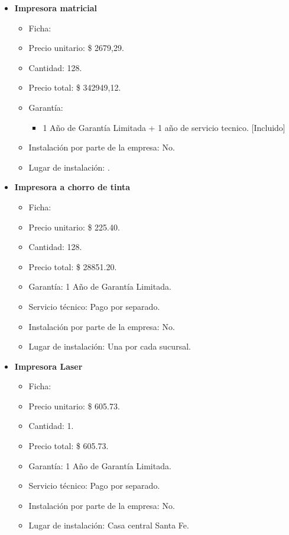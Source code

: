 \begin{itemize}
  \item \textbf{Impresora matricial}
    \begin{itemize}
      \item Ficha:
      \item Precio unitario: \$ 2679,29.
      \item Cantidad: 128.
      \item Precio total: \$ 342949,12.
      
      \item Garantía:
        \begin{itemize}
          \item 1 Año de Garantía Limitada + 1 año de servicio tecnico. [Incluido]
        \end{itemize}
      \item Instalación por parte de la empresa: No.
      \item Lugar de instalación: .
    \end{itemize}
    
  \item \textbf{Impresora a chorro de tinta}
    \begin{itemize}
      \item Ficha:
      \item Precio unitario: \$ 225.40.
      \item Cantidad: 128.
      \item Precio total: \$ 28851.20.
      
      \item Garantía: 1 Año de Garantía Limitada.
      \item Servicio técnico: Pago por separado.
      \item Instalación por parte de la empresa: No.
      \item Lugar de instalación: Una por cada sucursal.
    \end{itemize}
    
  \item \textbf{Impresora Laser}
    \begin{itemize}
      \item Ficha:
      \item Precio unitario: \$ 605.73.
      \item Cantidad: 1.
      \item Precio total: \$ 605.73.
      
      \item Garantía: 1 Año de Garantía Limitada.
      \item Servicio técnico: Pago por separado.
      \item Instalación por parte de la empresa: No.
      \item Lugar de instalación: Casa central Santa Fe.
    \end{itemize}
\end{itemize}

\pagebreak